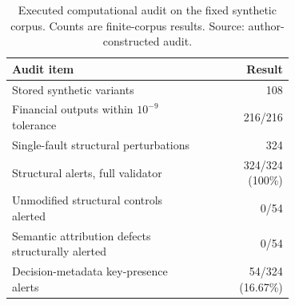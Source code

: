 \setcounter{table}{1}
\begin{table}[htbp]
\centering
\caption{Executed computational audit on the fixed synthetic corpus. Counts are finite-corpus results. Source: author-constructed audit.}
\label{tab:computational-audit}
\small
\begin{tabular}{@{}p{0.70\linewidth}r@{}}
\toprule
Audit item & Result \\
\midrule
Stored synthetic variants & 108 \\
Financial outputs within $10^{-9}$ tolerance & 216/216 \\
Single-fault structural perturbations & 324 \\
Structural alerts, full validator & 324/324 (100\%) \\
Unmodified structural controls alerted & 0/54 \\
Semantic attribution defects structurally alerted & 0/54 \\
Decision-metadata key-presence alerts & 54/324 (16.67\%) \\
\bottomrule
\end{tabular}
\end{table}
